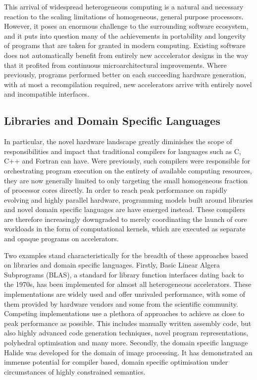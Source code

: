     This arrival of widespread heterogeneous computing is a natural and
    necessary reaction to the scaling limitations of homogeneous, general
    purpose processors.
    However, it poses an enormous challenge to the surrounding software
    ecosystem, and it puts into question many of the achievements in portability
    and longevity of programs that are taken for granted in modern computing.
    Existing software does not automatically benefit from entirely new
    acccelerator designs in the way that it profited from continuous
    microarchitectural improvements.
    Where previously, programs performed better on each succeeding hardware
    generation, with at most a recompilation required, new accelerators arrive
    with entirely novel and incompatible interfaces.

\subsection*{Libraries and Domain Specific Languages}

    In particular, the novel hardware landscape greatly diminishes the
    scope of responsibilities and impact that traditional compilers for
    languages such as C, C++ and Fortran can have.
    Were previously, such compilers were responsible for orchestrating
    program execution on the entirety of available computing resources, they are
    now generally limited to only targeting the small homogeneous fraction of
    processor cores directly.
    In order to reach peak performance on rapidly evolving and highly parallel
    hardware, programming models built around libraries and novel domain
    specific languages are have emerged instead.
    These compilers are therefore increasingly downgraded to merely coordinating
    the launch of core workloads in the form of computational kernels, which are
    executed as separate and opaque programs on accelerators.

    Two examples stand characteristically for the breadth of these approaches
    based on libraries and domain specific languages.
    Firstly, Basic Linear Algera Subprograms (BLAS), a standard for library
    function interfaces dating back to the 1970s, has been implemented for
    almost all heterogeneous accelerators.
    These implementations are widely used and offer unrivaled performance, with
    some of them provided by hardware vendors and some from the scientific
    community.
    Competing implementations use a plethora of approaches to achieve as close
    to peak performance as possible.
    This includes manually written assembly code, but also highly advanced
    code generation techniques, novel program representations, polyhedral
    optimisation and many more.
    Secondly, the domain specific language Halide was developed for the domain
    of image processing.
    It has demonstrated an immense potential for compiler based, domain specific
    optimisation under circumstances of highly constrained semantics.

